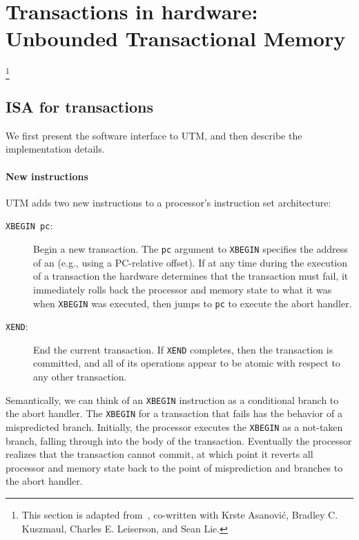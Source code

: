 \chapter[Transactions in hardware]{Transactions in hardware: Unbounded Transactional Memory}\label{sec:htm}

\footnote{This section is adapted from~\cite{AnanianAsKuLeLi04},
co-written with Krste Asanovi\'c, Bradley C. Kuszmaul, Charles
E. Leiserson, and Sean Lie.}

\section{ISA for transactions}\label{sec:isa}
  We first present the
software interface to UTM, and then describe the implementation
details.

\subsubsection{New instructions}

UTM adds two new instructions to a processor's instruction set
architecture:
\begin{description}
\item[\texttt{XBEGIN pc}:] Begin a new transaction.  The
\texttt{pc} argument to \texttt{XBEGIN} specifies
the address of an  (e.g., using a PC-relative offset).
If at any time during the execution of a transaction the hardware determines
that the transaction must fail, it immediately rolls back the
processor and memory state to what it was when \texttt{XBEGIN} was
executed, then jumps to \texttt{pc} to execute the abort handler.
 
\item[\texttt{XEND}:] End the current transaction.  If \texttt{XEND}
completes, then the transaction is committed, and all of its
operations appear to be atomic with respect to any other transaction.
\end{description}

Semantically, we can think of an \texttt{XBEGIN} instruction as a
conditional branch to the abort handler.  The \texttt{XBEGIN} for a
transaction that fails has the behavior of a mispredicted branch.
Initially, the processor executes the \texttt{XBEGIN} as a not-taken
branch, falling through into the body of the transaction.  Eventually
the processor realizes that the transaction cannot commit, at which
point it reverts all processor and memory state back to the point of
misprediction and branches to the abort handler.

